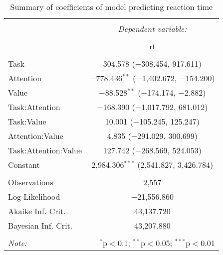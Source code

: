 
\begin{table}[!b] \centering 
  \caption{Summary of coefficients of model predicting reaction time} 
  \label{table:rtModel} 
\begin{tabular}{@{\extracolsep{5pt}}lc} 
\\[-1.8ex]\hline 
\hline \\[-1.8ex] 
 & \multicolumn{1}{c}{\textit{Dependent variable:}} \\ 
\cline{2-2} 
\\[-1.8ex] & rt \\ 
\hline \\[-1.8ex] 
 Task & 304.578 ($-$308.454, 917.611) \\ 
  Attention & $-$778.436$^{**}$ ($-$1,402.672, $-$154.200) \\ 
  Value & $-$88.528$^{**}$ ($-$174.174, $-$2.882) \\ 
  Task:Attention & $-$168.390 ($-$1,017.792, 681.012) \\ 
  Task:Value & 10.001 ($-$105.245, 125.247) \\ 
  Attention:Value & 4.835 ($-$291.029, 300.699) \\ 
  Task:Attention:Value & 127.742 ($-$268.569, 524.053) \\ 
  Constant & 2,984.306$^{***}$ (2,541.827, 3,426.784) \\ 
 \hline \\[-1.8ex] 
Observations & 2,557 \\ 
Log Likelihood & $-$21,556.860 \\ 
Akaike Inf. Crit. & 43,137.720 \\ 
Bayesian Inf. Crit. & 43,207.880 \\ 
\hline 
\hline \\[-1.8ex] 
\textit{Note:}  & \multicolumn{1}{r}{$^{*}$p$<$0.1; $^{**}$p$<$0.05; $^{***}$p$<$0.01} \\ 
\end{tabular} 
\end{table} 
